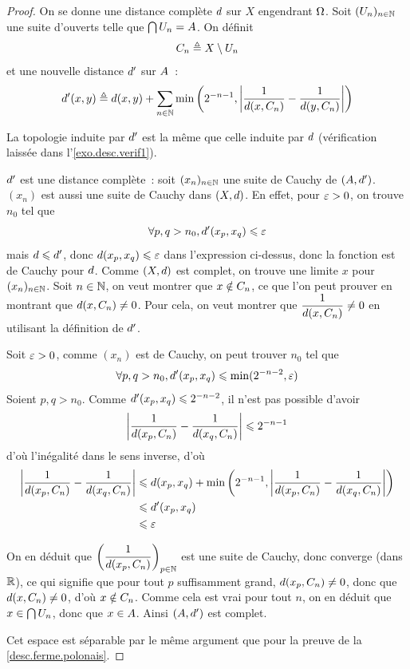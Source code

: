 \begin{proof}
  On se donne une distance complète $d$ sur $X$ engendrant $\Omega$. Soit
  $(U_n)_{n\in\mathbb N}$ une suite d'ouverts telle que
  $\bigcap U_n = A$. On définit
  \[C_n \triangleq X\setminus U_n\]
  et une nouvelle distance $d'$ sur $A$~:
  \[d'(x,y) \triangleq d(x,y) + \sum_{n\in \mathbb N} \min\left(2^{-n-1},
  \left|\frac{1}{d(x,C_n)} - \frac{1}{d(y,C_n)}\right|
  \right)\]

  La topologie induite par $d'$ est la même que celle induite par
  $d$ (vérification laissée dans l'\cref{exo.desc.verif1}).

  $d'$ est une distance complète~: soit $(x_n)_{n\in\mathbb N}$ une suite de
  Cauchy de $(A,d')$. $(x_n)$ est aussi une suite de Cauchy dans
  $(X,d)$. En effet, pour $\varepsilon > 0$, on trouve $n_0$ tel que
  \[\forall p,q > n_0, d'(x_p,x_q) \leqslant \varepsilon\]
  mais $d \leqslant d'$, donc $d(x_p,x_q) \leqslant \varepsilon$ dans
  l'expression ci-dessus, donc la fonction est de Cauchy pour $d$. Comme
  $(X,d)$ est complet, on trouve une limite $x$ pour $(x_n)_{n\in\mathbb N}$. Soit
  $n\in \mathbb N$, on veut montrer que $x\notin C_n$, ce que l'on peut prouver
  en montrant que $d(x,C_n) \neq 0$. Pour cela, on veut montrer que
  $\dfrac{1}{d(x,C_n)} \neq 0$ en utilisant la définition de
  $d'$.

  Soit $\varepsilon > 0$, comme $(x_n)$ est de Cauchy, on peut trouver $n_0$ tel que
  \[\forall p,q > n_0, d'(x_p,x_q) \leqslant \min(2^{-n-2}, \varepsilon)\]
  Soient $p,q > n_0$. Comme $d'(x_p,x_q) \leqslant 2^{-n-2}$, il n'est pas
  possible d'avoir
  \[\left|\frac{1}{d(x_p,C_n)}-\frac{1}{d(x_q,C_n)}\right|
  \leqslant 2^{-n-1}\]
  d'où l'inégalité dans le sens inverse, d'où
  \begin{align*}
    \left|\frac{1}{d(x_p,C_n)} -
    \frac{1}{d(x_q,C_n)}\right| & \leqslant
    d(x_p,x_q) + \min\left(2^{-n-1},\left|\frac{1}{d(x_p,C_n)}
    - \frac{1}{d(x_q,C_n)}\right|\right)\\
    &\leqslant d'(x_p,x_q)\\
    &\leqslant \varepsilon
  \end{align*}

  On en déduit que
  $\displaystyle\left(\frac{1}{d(x_p,C_n)}\right)_{p\in\mathbb N}$ est une
  suite de Cauchy, donc converge (dans $\mathbb R$), ce qui signifie que pour tout $p$
  suffisamment grand, $d(x_p,C_n) \neq 0$, donc que
  $d(x,C_n) \neq 0$, d'où $x\notin C_n$. Comme cela est vrai
  pour tout $n$, on en déduit que $x\in \bigcap U_n$, donc que
  $x\in A$. Ainsi $(A,d')$ est complet.

  Cet espace est séparable par le même argument que pour la preuve de la
  \cref{desc.ferme.polonais}.
\end{proof}

